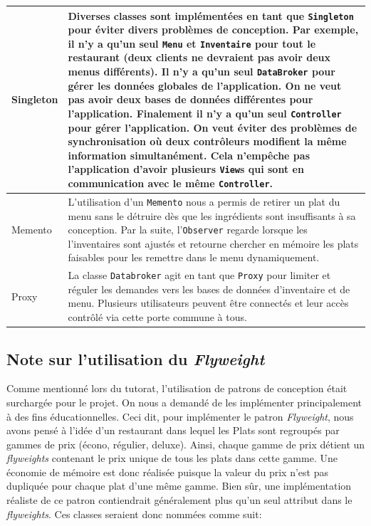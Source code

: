 \documentclass[a11paper, 11pt]{article}
\begin{document}
\newpage
\begin{table}[H]
\begin{longtable}{lp{10cm}}

\midrule
Singleton&
Diverses classes sont implémentées en tant que \verb|Singleton| pour éviter
divers problèmes de conception. Par exemple, il n'y a qu'un seul \verb|Menu| et
\verb|Inventaire| pour tout le restaurant (deux clients ne devraient pas avoir
deux menus différents). Il n'y a qu'un seul \verb|DataBroker| pour gérer les
données globales de l'application. On ne veut pas avoir deux bases de données
différentes pour l'application. Finalement il n'y a qu'un seul
\verb|Controller| pour gérer l'application. On veut éviter des problèmes de
synchronisation où deux contrôleurs modifient la même information
simultanément. Cela n'empêche pas l'application d'avoir plusieurs
\verb|View|s qui sont en communication avec le même \verb|Controller|. \\

\midrule Memento&
L'utilisation d'un \verb|Memento| nous a permis de retirer un plat du menu sans
le détruire dès que les ingrédients sont insuffisants à sa conception. Par la
suite, l'\verb|Observer| regarde lorsque les l'inventaires sont ajustés et
retourne chercher en mémoire les plats faisables pour les remettre dans le menu
dynamiquement.\\

\midrule
Proxy&
La classe \verb|Databroker| agit en tant que \verb|Proxy| pour limiter et
réguler les demandes vers les bases de données d'inventaire et de menu.
Plusieurs utilisateurs peuvent être connectés et leur accès contrôlé via cette
porte commune à tous.\\

\bottomrule
\end{longtable}
\end{table}

\subsection{Note sur l'utilisation du \textit{Flyweight}}
\label{flyweight-notes}

Comme mentionné lors du tutorat, l'utilisation de patrons de conception était
surchargée pour le projet. On nous a demandé de les implémenter principalement à
des fins éducationnelles. Ceci dit, pour implémenter le patron
\textit{Flyweight}, nous avons pensé à l'idée d'un restaurant dans lequel les
Plats sont regroupés par gammes de prix (écono, régulier, deluxe). Ainsi,
chaque gamme de prix détient un \textit{flyweights} contenant le prix unique de
tous les plats dans cette gamme. Une économie de mémoire est donc réalisée
puisque la valeur du prix n'est pas dupliquée pour chaque plat d'une même
gamme. Bien sûr, une implémentation réaliste de ce patron contiendrait
généralement plus qu'un seul attribut dans le \textit{flyweights}. Ces classes
seraient donc nommées comme suit:
\end{document}
